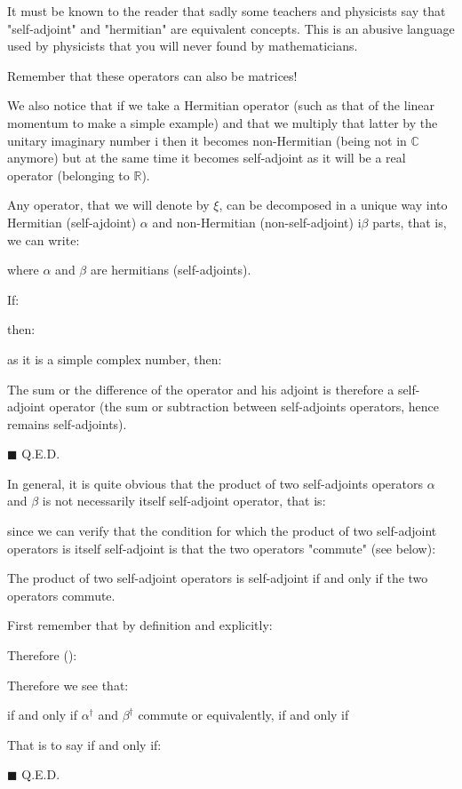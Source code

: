 	It must be known to the reader that sadly some teachers and physicists say	that "self-adjoint" and "hermitian" are equivalent concepts. This is an abusive language used by physicists that you will never found by mathematicians. 
	\begin{tcolorbox}[title=Remark,colframe=black,arc=10pt]
	Remember that these operators can also be matrices!
	\end{tcolorbox}
	We also notice that if we take a Hermitian operator (such as that of the linear momentum to make a simple example) and that we multiply that latter by the unitary imaginary number $\mathrm{i}$ then it becomes non-Hermitian\label{non-hermitian operator} (being not in $\mathbb{C}$ anymore) but at the same time it becomes self-adjoint as it will be a real operator (belonging to $\mathbb{R}$).
	\begin{theorem}
	Any operator, that we will denote by $\xi$, can be decomposed in a unique way into Hermitian (self-ajdoint) $\alpha$ and non-Hermitian (non-self-adjoint) $\mathrm{i}\beta$ parts, that is, we can write:
	
	where $\alpha$ and $\beta$ are hermitians (self-adjoints).
	\end{theorem}

	\begin{dem}
	If:
	
	then:
	
	as it is a simple complex number, then:
	
	The sum or the difference of the operator and his adjoint is therefore a self-adjoint operator (the sum or subtraction between self-adjoints operators, hence remains self-adjoints).
	\begin{flushright}
		$\blacksquare$  Q.E.D.
	\end{flushright}
	\end{dem}
	In general, it is quite obvious that the product of two self-adjoints operators $\alpha$ and $\beta$  is not necessarily itself self-adjoint operator, that is:
	
 	since we can verify that the condition for which the product of two self-adjoint operators is itself self-adjoint is that the two operators "commute" (see below):
 	\begin{theorem}
	The product of two self-adjoint operators is self-adjoint if and only if the two operators commute.
	\end{theorem}

	\begin{dem}
	First remember that by definition and explicitly:
	
	Therefore ():
	
	Therefore we see that:
	
	if and only if $\alpha^\dagger$ and $\beta^\dagger$ commute or equivalently, if and only if
	
	That is to say if and only if:
	
	\begin{flushright}
		$\blacksquare$  Q.E.D.
	\end{flushright}
	\end{dem}
	
